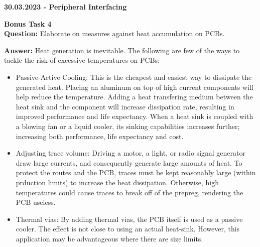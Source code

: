 \documentclass[12pt,a4paper]{letter}
\begin{document}
	\textbf{30.03.2023 - Peripheral Interfacing}

	\textbf{Bonus Task 4}\\

	\textbf{Question:} Elaborate on measures against heat accumulation on PCBs.

	\textbf{Answer:} Heat generation is inevitable. The following are few of the ways to tackle the risk of excessive temperatures on PCBs:

	\begin{itemize}
		\item Passive-Active Cooling: This is the cheapest and easiest way to dissipate the generated heat. Placing an aluminum on top of high current components will help reduce the temperature. Adding a heat transfering medium between the heat sink and the component will increase dissipation rate, resulting in improved performance and life expectancy. When a heat sink is coupled with a blowing fan or a liquid cooler, its sinking capabilities increases further; increasing both performance, life expectancy and cost.

		\item Adjusting trace volume: Driving a motor, a light, or radio signal generator draw large currents, and consequently generate large amounts of heat. To protect the routes and the PCB, traces must be kept reasonably large (within prduction limits) to increase the heat dissipation. Otherwise, high temperatures could cause traces to break off of the prepreg, rendering the PCB useless.

		\item Thermal vias: By adding thermal vias, the PCB itself is used as a passive cooler. The effect is not close to using an actual heat-sink. However, this application may be advantageous where there are size limits.

	\end{itemize}
\end{document}
